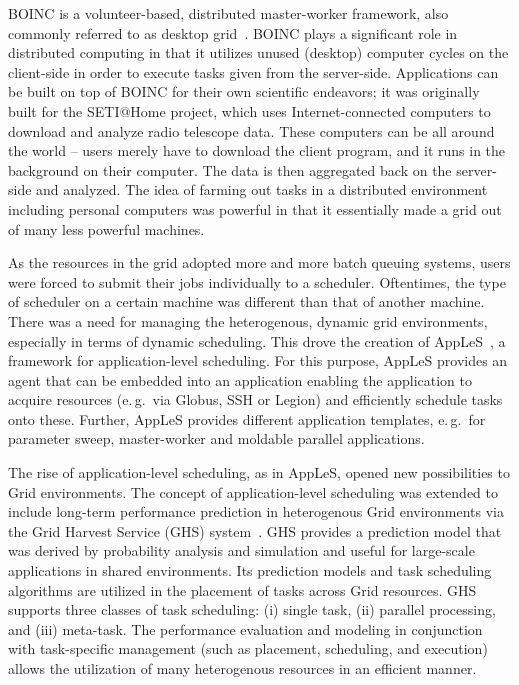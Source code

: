\documentclass{sig-alternate}
\begin{document}
BOINC is a volunteer-based, distributed master-worker framework, also commonly
referred to as desktop grid~\cite{Anderson:2004:BSP:1032646.1033223}.
BOINC plays a significant role in distributed computing in that it utilizes
unused (desktop) computer cycles on the client-side in order to execute tasks given from
the server-side. Applications can be built on top of BOINC for their own
scientific endeavors; it was originally built for the SETI@Home project, which
uses Internet-connected computers to download and analyze radio telescope data.
These computers can be all around the world -- users merely have to
download the client program, and it runs in the background on their computer.
The data is then aggregated back on the server-side and analyzed. The idea of
farming out tasks in a distributed environment including personal computers was
powerful in that it essentially made a grid out of many less powerful machines.

As the resources in the grid adopted more and more batch queuing
systems, users were forced to submit their jobs individually to a
scheduler. Oftentimes, the type of scheduler on a certain machine was
different than that of another machine. There was a need for managing
the heterogenous, dynamic grid environments, especially in terms of
dynamic scheduling. This drove the creation of
AppLeS~\cite{Berman:2003:ACG:766629.766632}, a framework for
application-level scheduling. For this purpose, AppLeS provides an
agent that can be embedded into an application enabling the
application to acquire resources (e.\,g.\ via Globus, SSH or Legion)
and efficiently schedule tasks onto these. Further, AppLeS provides
different application templates, e.\,g.\ for parameter sweep,
master-worker and moldable parallel applications.

The rise of application-level scheduling, as in AppLeS, opened new
possibilities to Grid environments. The concept of application-level
scheduling was extended to include long-term performance prediction in
heterogenous Grid environments via the Grid Harvest Service (GHS)
system~\cite{ghs}. GHS provides a prediction model that was derived by
probability analysis and simulation and useful for large-scale
applications in shared environments. Its prediction models and task
scheduling algorithms are utilized in the placement of tasks across
Grid resources. GHS supports three classes of task scheduling: (i)
single task, (ii) parallel processing, and (iii) meta-task. The
performance evaluation and modeling in conjunction with task-specific
management (such as placement, scheduling, and execution) allows the
utilization of many heterogenous resources in an efficient manner.
\end{document}
